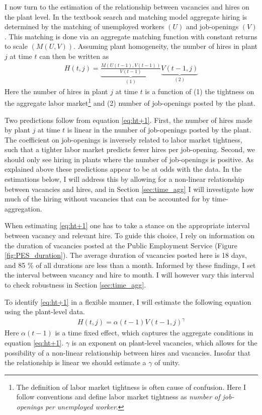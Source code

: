 I now turn to the estimation of the relationship between vacancies and hires on the plant level. In the textbook search and matching model aggregate hiring is determined by the matching of unemployed workers $(U)$ and job-openings $(V)$. This matching is done via an aggregate matching function with constant returns to scale $(M(U,V))$. Assuming plant homogeneity, the number of hires in plant $j$ at time $t$ can then be written as 
\begin{align}
H(t, j)=\underbrace{\frac{M(U(t-1),V(t-1))}{V(t-1)}}_{(1)} \underbrace{V(t-1,j)}_{(2)}
\label{eq:ht+1}
\end{align}
Here the number of hires in plant $j$ at time $t$ is a function of (1) the tightness on the aggregate labor market\footnote{The definition of labor market tightness is often cause of confusion. Here I follow conventions and define labor market tightness as \emph{number of job-openings per unemployed worker}.} and (2) number of job-openings posted by the plant.

Two predictions follow from equation \eqref{eq:ht+1}. First, the number of hires made by plant $j$ at time $t$ is linear in the number of job-openings posted by the plant. The coefficient on job-openings is inversely related to labor market tightness, such that a tighter labor market predicts fewer hires per job-opening. Second, we should only see hiring in plants where the number of job-openings is positive. As explained above these predictions appear to be at odds with the data. In the estimations below, I will address this by allowing for a non-linear relationship between vacancies and hires, and in Section \ref{sec:time_agg} I will investigate how much of the hiring without vacancies that can be accounted for by time-aggregation. 

When estimating \eqref{eq:ht+1} one has to take a stance on the appropriate interval between vacancy and relevant hire. To guide this choice, I rely on information on the duration of vacancies posted at the Public Employment Service (Figure \ref{fig:PES_duration}). The average duration of vacancies posted here is 18 days, and 85 \% of all durations are less than a month. Informed by these findings, I set the interval between vacancy and hire to month. I will however vary this interval to check robustness in Section \ref{sec:time_agg}.

To identify \eqref{eq:ht+1} in a flexible manner, I will estimate the following equation using the plant-level data.
\begin{align}
H(t,j)=\alpha(t-1) V(t-1,j)^{\gamma}
\label{eq:estimation_equation}
\end{align}
Here $\alpha(t-1)$ is a time fixed effect, which captures the aggregate conditions in equation \eqref{eq:ht+1}. $\gamma$ is an exponent on plant-level vacancies, which allows for the possibility of a non-linear relationship between hires and vacancies. Insofar that the relationship is linear we should estimate a $\gamma$ of unity.

